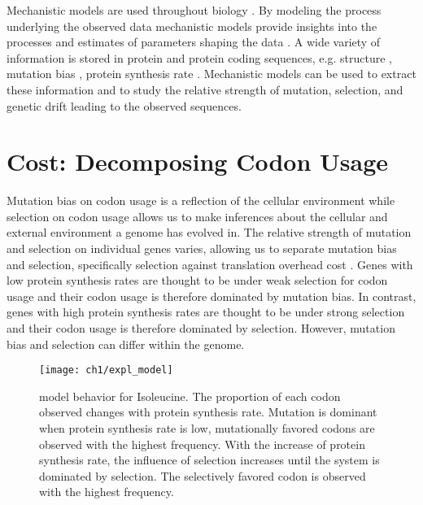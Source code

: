 Mechanistic models are used throughout biology \citep{GoldmanAndYang1994,loreau1998,DavisAndPelsor2001,adf2007,McGill2007}.
By modeling the process underlying the observed data mechanistic models provide insights into the processes and estimates of parameters shaping the data \citep{Liberles2013}.
A wide variety of information is stored in protein and protein coding sequences, e.g. structure \citep{anfinsen1973}, mutation bias \citep{ShahAndGilchrist2011, gilchrist2015}, protein synthesis rate \citep{gilchrist2007,gilchrist2015}. 
Mechanistic models can be used to extract these information and to study the relative strength of mutation, selection, and genetic drift leading to the observed sequences.

\section{Cost: Decomposing Codon Usage}

Mutation bias on codon usage is a reflection of the cellular environment while selection on codon usage allows us to make inferences about the cellular and external environment a genome has evolved in.
The relative strength of mutation and selection on individual genes varies, allowing us to separate mutation bias and selection, specifically selection against translation overhead cost \citep{gilchrist2007,ShahAndGilchrist2011,gilchrist2015}.
Genes with low protein synthesis rates are thought to be under weak selection for codon usage and their codon usage is therefore dominated by mutation bias.
In contrast, genes with high protein synthesis rates are thought to be under strong selection and their codon usage is therefore dominated by selection.
However, mutation bias and selection can differ within the genome.

\singlespacing
\begin{figure}
     \centering
	\texttt{[image: ch1/expl\_model]}
	\caption{\ROC model behavior for Isoleucine.
	The proportion of each codon observed changes with protein synthesis rate.
	Mutation is dominant when protein synthesis rate is low, mutationally favored codons are observed with the highest frequency.
	With the increase of protein synthesis rate, the influence of selection increases until the system is dominated by selection.
	The selectively favored codon is observed with the highest frequency.}
	\label{fig:expl_model}
\end{figure}
\doublespacing

